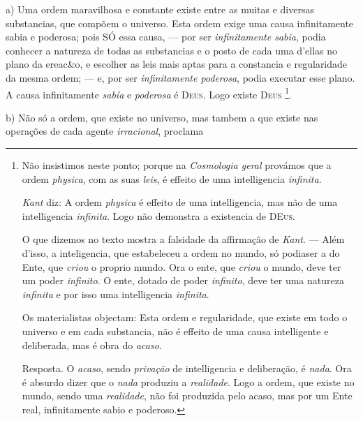 a) Uma ordem maravilhosa e constante existe entre as muitas e diversas substancias, que compõem o universo. Esta ordem exige uma causa infinitamente sabia e poderosa; pois SÓ essa causa, --- por ser \emph{infinitamente sabia}, podia conhecer a natureza de todas as substancias e o posto de cada uma d'ellas no plano da ereac\&o, e escolher as leis mais aptas para a constancia e regularidade da mesma ordem; --- e, por ser \emph{infinitamente poderosa}, podia executar esse plano. A causa infinitamente \emph{sabía} e \emph{poderosa} é \textsc{Deus}. Logo existe \textsc{Deus} \footnote{Não insistimos neste ponto; porque na \emph{Cosmologia geral} provámos que a ordem \emph{physica}, com as suas \emph{leis}, é effeito de uma intelligencia \emph{infinita}.\par \emph{Kant} diz: A ordem \emph{physica} é effeito de uma intelligencia, mas não de uma intelligencia \emph{infinita}. Logo não demonstra a existencia de \textsc{DEus}.\par O que dizemos no texto mostra a falsidade da affirmação de \emph{Kant}. --- Além d'isso, a inteligencia, que estabeleceu a ordem no mundo, só podiaser a do Ente, que \emph{criou} o proprio mundo. Ora o ente, que \emph{criou} o mundo, deve ter um poder \emph{infinito}. O ente, dotado de poder \emph{infinito}, deve ter uma natureza \emph{infinita} e por isso uma intelligencia \emph{infinita}.\par Os materialistas objectam: Esta ordem e regularidade, que existe em todo o universo e em cada substancia, não é effeito de uma causa intelligente e deliberada, mas é obra do \emph{acaso}.\par Resposta. O \emph{acaso}, sendo \emph{privação} de intelligencia e deliberação, é \emph{nada}. Ora é absurdo dizer que o \emph{nada} produziu a \emph{realidade}. Logo a ordem, que existe no mundo, sendo uma \emph{realidade}, não foi produzida pelo acaso, mas por um Ente real, infinitamente sabio e poderoso.}.

b) Não só a ordem, que existe no universo, mas tambem a que existe nas operações de cada agente \emph{irracional}, proclama 